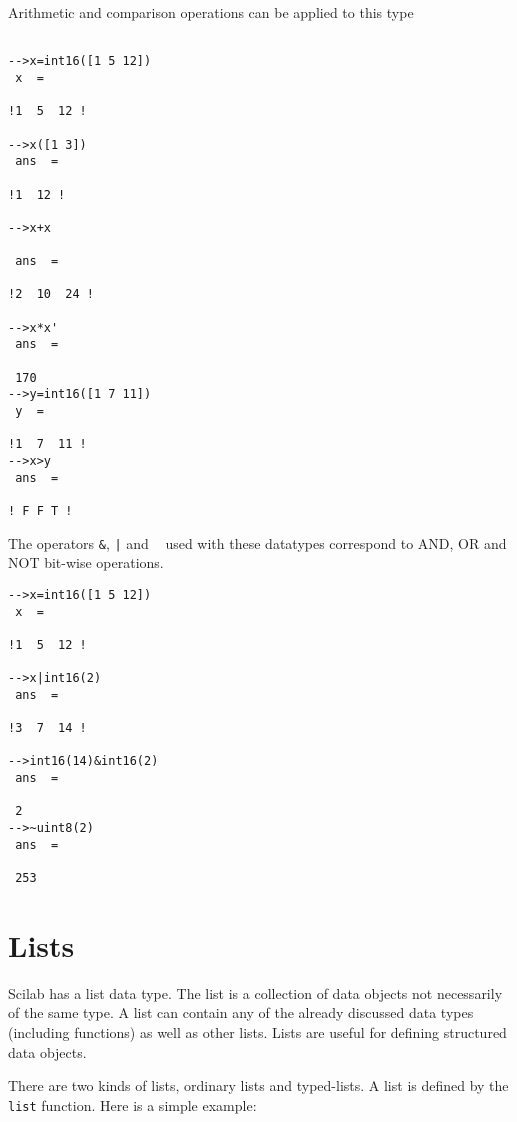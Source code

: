 Arithmetic and comparison operations can be applied to this type

\begin{verbatim}

-->x=int16([1 5 12])
 x  =
 
!1  5  12 !

-->x([1 3])
 ans  =
 
!1  12 !
 
-->x+x

 ans  =
 
!2  10  24 !

-->x*x'             
 ans  =
 
 170
-->y=int16([1 7 11])
 y  =
 
!1  7  11 !
-->x>y
 ans  =
 
! F F T !
\end{verbatim} 

The operators \verb!&!, {\tt |} and {\tt ~} used with these datatypes correspond to
AND, OR and NOT bit-wise operations. 


\begin{verbatim}
-->x=int16([1 5 12])
 x  =
 
!1  5  12 !
 
-->x|int16(2)
 ans  =
 
!3  7  14 !

-->int16(14)&int16(2)
 ans  =
 
 2  
-->~uint8(2)
 ans  =
 
 253
\end{verbatim}

\section{Lists}
\label{s2.5}

	Scilab has a list data type.  The list is a collection of data
objects not necessarily of the same type.  A list can contain any of
the already discussed data types (including functions) as well as
other lists.  Lists are useful for defining structured data objects.

There are two kinds of lists, ordinary lists and typed-lists.
A list is defined by the {\tt list} function. Here is a simple
example:

